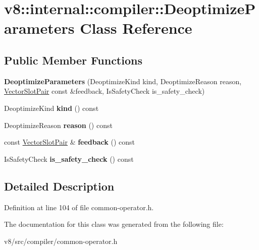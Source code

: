 \hypertarget{classv8_1_1internal_1_1compiler_1_1DeoptimizeParameters}{}\section{v8\+:\+:internal\+:\+:compiler\+:\+:Deoptimize\+Parameters Class Reference}
\label{classv8_1_1internal_1_1compiler_1_1DeoptimizeParameters}
\subsection*{Public Member Functions}
\begin{DoxyCompactItemize}
\item 
\mbox{\label{classv8_1_1internal_1_1compiler_1_1DeoptimizeParameters_a016f7293d61db22c30c38943f2ae1f60}} 
{\bfseries Deoptimize\+Parameters} (Deoptimize\+Kind kind, Deoptimize\+Reason reason, \mbox{\hyperlink{classv8_1_1internal_1_1VectorSlotPair}{Vector\+Slot\+Pair}} const \&feedback, Is\+Safety\+Check is\+\_\+safety\+\_\+check)
\item 
\mbox{\label{classv8_1_1internal_1_1compiler_1_1DeoptimizeParameters_aeab1d74182e3abe17f3b0d1d59fd2e9d}} 
Deoptimize\+Kind {\bfseries kind} () const
\item 
\mbox{\label{classv8_1_1internal_1_1compiler_1_1DeoptimizeParameters_a1a14a391d373af30353251e34db11a9a}} 
Deoptimize\+Reason {\bfseries reason} () const
\item 
\mbox{\label{classv8_1_1internal_1_1compiler_1_1DeoptimizeParameters_a52e2a5f4664589868478a7cefe481a5e}} 
const \mbox{\hyperlink{classv8_1_1internal_1_1VectorSlotPair}{Vector\+Slot\+Pair}} \& {\bfseries feedback} () const
\item 
\mbox{\label{classv8_1_1internal_1_1compiler_1_1DeoptimizeParameters_aea0afcbf0298f370f278cc7031f2f6b4}} 
Is\+Safety\+Check {\bfseries is\+\_\+safety\+\_\+check} () const
\end{DoxyCompactItemize}


\subsection{Detailed Description}


Definition at line 104 of file common-\/operator.\+h.



The documentation for this class was generated from the following file\+:\begin{DoxyCompactItemize}
\item 
v8/src/compiler/common-\/operator.\+h\end{DoxyCompactItemize}

